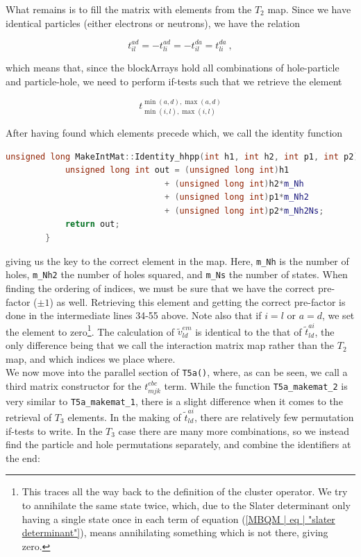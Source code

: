 \documentclass[10pt,twoside]{report}
\begin{document}
	What remains is to fill the matrix with elements from the $T_2$ map. Since we have identical particles (either electrons or neutrons), we have the relation
	
	\begin{equation}
		t_{il}^{ad} = -t_{li}^{ad} = -t_{il}^{da} = t_{li}^{da}\:,
	\end{equation}
	
	which means that, since the blockArrays hold all combinations of hole-particle and particle-hole, we need to perform if-tests such that we retrieve the element
	
	\begin{equation}
		t_{\min(i,l),\max(i,l)}^{\min(a,d),\max(a,d)}
	\end{equation}
	
	After having found which elements precede which, we call the identity function
	
	\begin{lstlisting}[language=C++]
		unsigned long MakeIntMat::Identity_hhpp(int h1, int h2, int p1, int p2){
			unsigned long int out = (unsigned long int)h1
								+ (unsigned long int)h2*m_Nh
								+ (unsigned long int)p1*m_Nh2
								+ (unsigned long int)p2*m_Nh2Ns;
			return out;
		}
	\end{lstlisting}
	
	giving us the key to the correct element in the map. Here, \texttt{m\_Nh} is the number of holes, \texttt{m\_Nh2} the number of holes squared, and \texttt{m\_Ns} the number of states. When finding the ordering of indices, we must be sure that we have the correct pre-factor ($\pm1$) as well. Retrieving this element and getting the correct pre-factor is done in the intermediate lines 34-55 above. Note also that if $i=l$ or $a=d$, we set the element to zero\footnote{This traces all the way back to the definition of the cluster operator. We try to annihilate the same state twice, which, due to the Slater determinant only having a single state once in each term of equation (\ref{MBQM | eq | "slater determinant"}), means annihilating something which is not there, giving zero.}. The calculation of $\tilde{v}_{ld}^{em}$ is identical to the that of $\tilde{t}_{ld}^{ai}$, the only difference being that we call the interaction matrix map rather than the $T_2$ map, and which indices we place where.\\
	
	We now move into the parallel section of \texttt{T5a()}, where, as can be seen, we call a third matrix constructor for the $t_{mjk}^{ebc}$ term. While the function \texttt{T5a\_makemat\_2} is very similar to \texttt{T5a\_makemat\_1}, there is a slight difference when it comes to the retrieval of $T_3$ elements. In the making of $\tilde{t}_{ld}^{ai}$, there are relatively few permutation if-tests to write. In the $T_3$ case there are many more combinations, so we instead find the particle and hole permutations separately, and combine the identifiers at the end:
	
\end{document}

